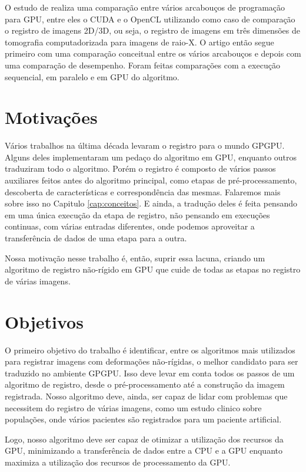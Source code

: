 	O estudo de \cite{membarth2011frameworks} realiza uma comparação entre vários arcabouços de programação para GPU,
entre eles o CUDA e o OpenCL utilizando como caso de comparação o registro de imagens 2D/3D, ou seja, o registro de
imagens em três dimensões de tomografia computadorizada para imagens de raio-X. O artigo então segue primeiro com uma
comparação conceitual entre os vários arcabouços e depois com uma comparação de desempenho. Foram feitas comparações 
com a execução sequencial, em paralelo e em GPU do algoritmo. 
	
\section{Motivações}
	Vários trabalhos na última década levaram o registro para o mundo GPGPU. Alguns deles implementaram um pedaço do 
algoritmo em GPU, enquanto outros traduziram todo o algoritmo. Porém o registro é composto de vários passos auxiliares
feitos antes do algoritmo principal, como etapas de pré-processamento, descoberta de características e correspondência
das mesmas. Falaremos mais sobre isso no Capitulo \ref{cap:conceitos}. E ainda, a tradução deles é feita pensando em 
uma única execução da etapa de registro, não pensando em execuções continuas, com várias entradas diferentes, onde 
podemos aproveitar a transferência de dados de uma etapa para a outra.
	
	Nossa motivação nesse trabalho é, então, suprir essa lacuna, criando um algoritmo de registro não-rígido em GPU que
cuide de todas as etapas no registro de várias imagens.
\section{Objetivos}
	O primeiro objetivo do trabalho é identificar, entre os algoritmos mais utilizados para registrar imagens com 
deformações não-rígidas, o melhor candidato para ser traduzido no ambiente GPGPU. Isso deve levar em conta todos os 
passos de um algoritmo de registro, desde o pré-processamento até a construção da imagem registrada. Nosso algoritmo deve,
ainda, ser capaz de lidar com problemas que necessitem do registro de várias imagens, como um estudo clinico sobre 
populações, onde vários pacientes são registrados para um paciente artificial.

	Logo, nosso algoritmo deve ser capaz de otimizar a utilização dos recursos da GPU, minimizando a transferência de dados
entre a CPU e a GPU enquanto maximiza a utilização dos recursos de processamento da GPU.
